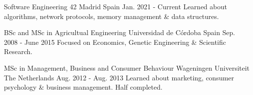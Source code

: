 
\begin{cventries}

  \cventry
    {Software Engineering} %
    {42 Madrid} %
    {Spain} %
    {Jan. 2021 - Current} %
    {
      {Learned about algorithms, network protocols, memory management \& data structures.}
    }

  \cventry
    {BSc and MSc in Agricultual Engineering} %
    {Universidad de Córdoba} %
    {Spain} %
    {Sep. 2008 - June 2015} %
    {
      {Focused on Economics, Genetic Engineering \& Scientific Research.}
    }

  \cventry
    {MSc in Management, Business and Consumer Behaviour} %
    {Wageningen Universiteit} %
    {The Netherlands} %
    {Aug. 2012 - Aug. 2013} %
    {
      {Learned about marketing, consumer psychology \& business management. Half completed.}
    }

\end{cventries}
